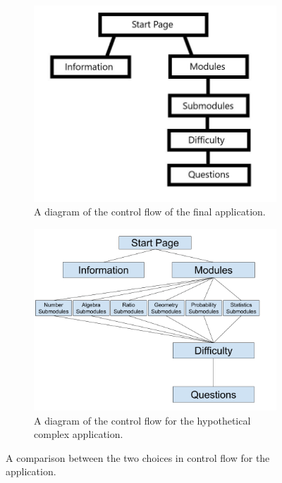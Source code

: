 \documentclass{article}
\begin{document}
\begin{figure}[H]
	\centering
	\begin{subfigure}{0.45\textwidth}
		\includegraphics[width=0.9\linewidth]{./data/applicationControlFlow.png}
		\caption{A diagram of the control flow of the final application.}
		\label{subfigure:applicationControlFlow}
	\end{subfigure}
	\hfill
	\begin{subfigure}{0.45\textwidth}
		\includegraphics[width=0.9\linewidth]{./data/adaptedControlFlow.png}
		\caption{A diagram of the control flow for the hypothetical complex application.}
		\label{subfigure:adaptedControlFlow}
	\end{subfigure}
	\caption{A comparison between the two choices in control flow for the application.}
	\label{figure:controlFlowComparisons}
\end{figure}
\end{document}
